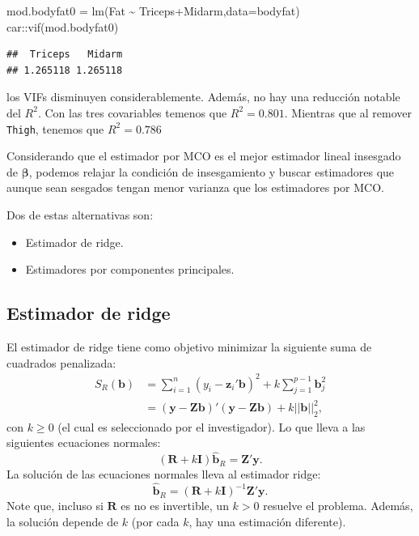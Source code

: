 \documentclass[
]{article}
\newenvironment{Shaded}{\begin{snugshade}}{\end{snugshade}}
\newcommand{\AttributeTok}[1]{\textcolor[rgb]{0.77,0.63,0.00}{#1}}
\newcommand{\FunctionTok}[1]{\textcolor[rgb]{0.00,0.00,0.00}{#1}}
\newcommand{\NormalTok}[1]{#1}
\newcommand{\OtherTok}[1]{\textcolor[rgb]{0.56,0.35,0.01}{#1}}
\newcommand{\SpecialCharTok}[1]{\textcolor[rgb]{0.00,0.00,0.00}{#1}}
\begin{document}
\begin{Shaded}
\begin{Highlighting}[]
\NormalTok{mod.bodyfat0 }\OtherTok{=} \FunctionTok{lm}\NormalTok{(Fat }\SpecialCharTok{\textasciitilde{}}\NormalTok{ Triceps}\SpecialCharTok{+}\NormalTok{Midarm,}\AttributeTok{data=}\NormalTok{bodyfat)}
\NormalTok{car}\SpecialCharTok{::}\FunctionTok{vif}\NormalTok{(mod.bodyfat0)}
\end{Highlighting}
\end{Shaded}

\begin{verbatim}
##  Triceps   Midarm 
## 1.265118 1.265118
\end{verbatim}

los VIFs disminuyen considerablemente. Además, no hay una reducción notable del \(R^2\). Con las tres covariables temenos que \(R^{2}=0.801\). Mientras que al remover \texttt{Thigh}, tenemos que \(R^{2} = 0.786\)

Considerando que el estimador por MCO es el mejor estimador lineal insesgado de \(\boldsymbol \beta\), podemos relajar la condición de insesgamiento y buscar estimadores que aunque sean sesgados tengan menor varianza que los estimadores por MCO.

Dos de estas alternativas son:

\begin{itemize}
\item
  Estimador de ridge.
\item
  Estimadores por componentes principales.
\end{itemize}

\hypertarget{estimador-de-ridge}{%
\subsection{Estimador de ridge}\label{estimador-de-ridge}}

El estimador de ridge tiene como objetivo minimizar la siguiente suma de cuadrados penalizada:
\begin{equation}
\begin{split}
S_{R}(\boldsymbol b) &= \sum_{i=1}^{n}(y_{i} - \boldsymbol z_{i}'\boldsymbol b)^{2} + k \sum_{j=1}^{p-1}\boldsymbol b_{j}^2 \\
&= (\boldsymbol y- \boldsymbol Z\boldsymbol b)'(\boldsymbol y- \boldsymbol Z\boldsymbol b) + k ||\boldsymbol b||_{2}^{2},
\end{split}
\nonumber
\end{equation}
con \(k \geq 0\) (el cual es seleccionado por el investigador). Lo que lleva a las siguientes ecuaciones normales:
\[
(\boldsymbol R+ k \boldsymbol I)\widehat{\boldsymbol b}_{R} = \boldsymbol Z'\boldsymbol y.
\]
La solución de las ecuaciones normales lleva al estimador ridge:
\[
\widehat{\boldsymbol b}_{R} = (\boldsymbol R+ k \boldsymbol I)^{-1}\boldsymbol Z'\boldsymbol y.
\]
Note que, incluso si \(\boldsymbol R\) es no es invertible, un \(k > 0\) resuelve el problema. Además, la solución depende de \(k\) (por cada \(k\), hay una estimación diferente).
\end{document}
